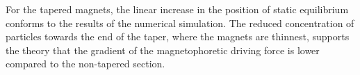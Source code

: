 For the tapered magnets, the linear increase in the position of static equilibrium conforms to the results of the numerical simulation. The reduced concentration of particles towards the end of the taper, where the magnets are thinnest, supports the theory that the gradient of the magnetophoretic driving force is lower compared to the non-tapered section.